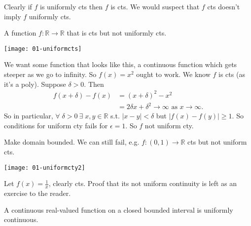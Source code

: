     \begin{remark}
        Clearly if $f$ is uniformly cts then $f$ is cts.
        We would suspect that $f$ cts doesn't imply $f$ uniformly cts.
    \end{remark} 

    \begin{example}
        A function $f: \mathbb{R} \to \mathbb{R}$ that is cts but not uniformly cts.

        {\par
    \centering 
    \texttt{[image: 01-uniformcts]} 
        \par}
        We want some function that looks like this, a continuous function which gets steeper as we go to infinity.
        So $f(x) = x^2$ ought to work.
        We know $f$ is cts (as it's a poly).
        Suppose $\delta > 0$.
        Then \begin{align*}
            f(x + \delta) - f(x) &= (x + \delta)^2 - x^2 \\
            &= 2 \delta x + \delta^2 \to \infty \text{ as } x \to \infty.
        \end{align*} 
        So in particular, $\forall \; \delta > 0 \ \exists \; x, y \in \mathbb{R}$ s.t. $|x-y| < \delta$ but $|f(x) - f(y)| \geq 1$.
        So conditions for uniform cty fails for $\epsilon = 1$.
        So $f$ not uniform cty.
    \end{example} 

    \begin{example} \label{exm:1/x}
        Make domain bounded.
        We can still fail, e.g. $f: (0, 1) \to \mathbb{R}$ cts but not uniform cts.

        { \par
        \centering 
        \texttt{[image: 01-uniformcty2]} 
        \par}

        Let $f(x) = \frac{1}{x}$, clearly cts.
        Proof that its not uniform continuity is left as an exercise to the reader.
    \end{example} 

    \begin{theorem} \label{thm:12}
        A continuous real-valued function on a closed bounded interval is uniformly continuous.
    \end{theorem} 

